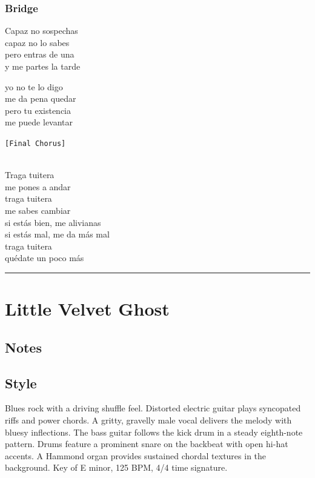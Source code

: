 \subsubsection{Bridge}\label{bridge-10}

Capaz no sospechas\\
capaz no lo sabes\\
pero entras de una\\
y me partes la tarde

yo no te lo digo\\
me da pena quedar\\
pero tu existencia\\
me puede levantar

\texttt{{[}Final\ Chorus{]}}\strut \\
Traga tuitera\\
me pones a andar\\
traga tuitera\\
me sabes cambiar\\
si estás bien, me alivianas\\
si estás mal, me da más mal\\
traga tuitera\\
quédate un poco más

\begin{center}\rule{0.5\linewidth}{0.5pt}\end{center}

\section{Little Velvet Ghost}\label{little-velvet-ghost}

\subsection{Notes}\label{notes-21}

\subsection{Style}\label{style-20}

Blues rock with a driving shuffle feel. Distorted electric guitar plays
syncopated riffs and power chords. A gritty, gravelly male vocal
delivers the melody with bluesy inflections. The bass guitar follows the
kick drum in a steady eighth-note pattern. Drums feature a prominent
snare on the backbeat with open hi-hat accents. A Hammond organ provides
sustained chordal textures in the background. Key of E minor, 125 BPM,
4/4 time signature.

